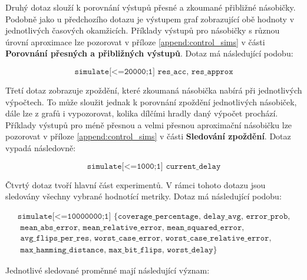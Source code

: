 Druhý dotaz slouží k porovnání výstupů přesné a zkoumané přibližné násobičky. Podobně jako u předchozího dotazu je výstupem graf zobrazující obě hodnoty v jednotlivých časových okamžicích. Příklady výstupů pro násobičky s různou úrovní aproximace lze pozorovat v příloze \ref{append:control_sims} v části \textbf{Porovnání přesných a přibližných výstupů}. Dotaz má následující podobu:

\begin{equation*}
    \texttt{simulate[<=20000;1] {res\_acc, res\_approx}}
\end{equation*}

Třetí dotaz zobrazuje zpoždění, které zkoumaná násobička nabírá při jednotlivých výpočtech. To může sloužit jednak k porovnání zpoždění jednotlivých násobiček, dále lze z grafů i vypozorovat, kolika dílčími hradly daný výpočet prochází. Příklady výstupů pro méně přesnou a velmi přesnou aproximační násobičku lze pozorovat v příloze \ref{append:control_sims} v části \textbf{Sledování zpoždění}. Dotaz vypadá následovně:

\begin{equation*}
    \texttt{simulate[<=1000;1] {current\_delay}}
\end{equation*}

\pagebreak

Čtvrtý dotaz tvoří hlavní část experimentů. V rámci tohoto dotazu jsou sledovány všechny vybrané hodnotící metriky. Dotaz má následující podobu:

\begin{equation*}
    \begin{array}{l}
        \texttt{simulate[<=10000000;1] \{coverage\_percentage, delay\_avg, error\_prob,} \\
        \texttt{    mean\_abs\_error, mean\_relative\_error, mean\_squared\_error,} \\
        \texttt{    avg\_flips\_per\_res, worst\_case\_error, worst\_case\_relative\_error,} \\
        \texttt{    max\_hamming\_distance, max\_bit\_flips, worst\_delay\}}
    \end{array}
\end{equation*}

Jednotlivé sledované proměnné mají následující význam:


